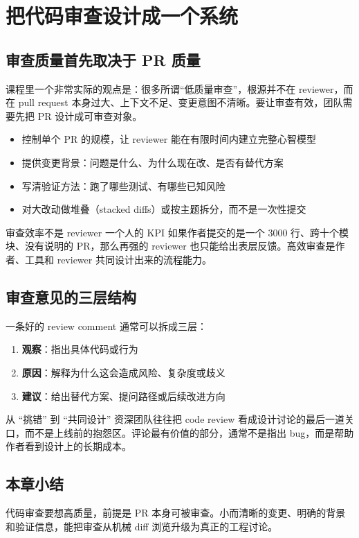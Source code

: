 \section{把代码审查设计成一个系统}

\subsection{审查质量首先取决于 PR 质量}

课程里一个非常实际的观点是：很多所谓``低质量审查''，根源并不在 reviewer，而在 pull request 本身过大、上下文不足、变更意图不清晰。要让审查有效，团队需要先把 PR 设计成可审查对象。

\begin{itemize}
    \item 控制单个 PR 的规模，让 reviewer 能在有限时间内建立完整心智模型
    \item 提供变更背景：问题是什么、为什么现在改、是否有替代方案
    \item 写清验证方法：跑了哪些测试、有哪些已知风险
    \item 对大改动做堆叠（stacked diffs）或按主题拆分，而不是一次性提交
\end{itemize}

\begin{importantbox}{审查效率不是 reviewer 一个人的 KPI}
如果作者提交的是一个 3000 行、跨十个模块、没有说明的 PR，那么再强的 reviewer 也只能给出表层反馈。高效审查是作者、工具和 reviewer 共同设计出来的流程能力。
\end{importantbox}

\subsection{审查意见的三层结构}

一条好的 review comment 通常可以拆成三层：

\begin{enumerate}
    \item \textbf{观察}：指出具体代码或行为
    \item \textbf{原因}：解释为什么这会造成风险、复杂度或歧义
    \item \textbf{建议}：给出替代方案、提问路径或后续改进方向
\end{enumerate}

\begin{knowledgebox}{从 ``挑错'' 到 ``共同设计''}
资深团队往往把 code review 看成设计讨论的最后一道关口，而不是上线前的抱怨区。评论最有价值的部分，通常不是指出 bug，而是帮助作者看到设计上的长期成本。
\end{knowledgebox}

\subsection{本章小结}

代码审查要想高质量，前提是 PR 本身可被审查。小而清晰的变更、明确的背景和验证信息，能把审查从机械 diff 浏览升级为真正的工程讨论。

